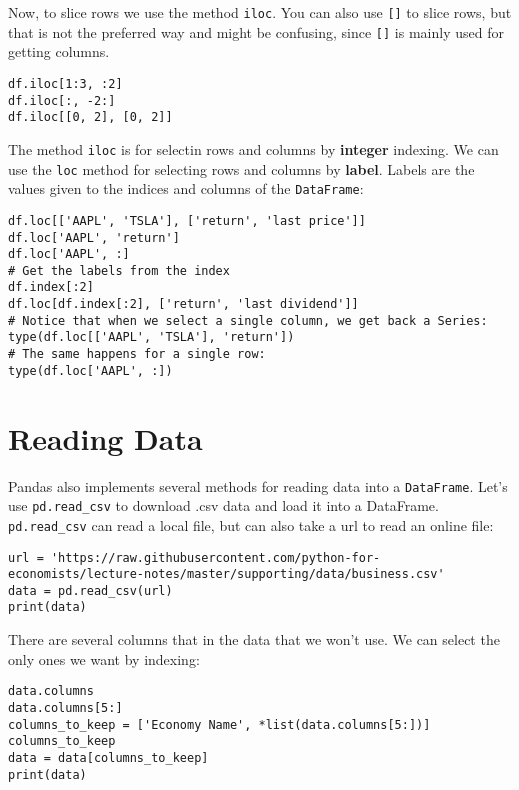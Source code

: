 \documentclass[12pt, a4paper]{article}
\begin{document}
Now, to slice rows we use the method \texttt{iloc}.
You can also use \texttt{[]} to slice rows, but that is not the preferred way and might be confusing, since \texttt{[]} is mainly used for getting columns.
\lstset{language=jupyter-python,label= ,caption= ,captionpos=b,numbers=none}
\begin{lstlisting}
df.iloc[1:3, :2]
df.iloc[:, -2:]
df.iloc[[0, 2], [0, 2]]
\end{lstlisting}
The method \texttt{iloc} is for selectin rows and columns by \textbf{\textbf{integer}} indexing.
We can use the \texttt{loc} method for selecting rows and columns by \textbf{\textbf{label}}.
Labels are the values given to the indices and columns of the \texttt{DataFrame}:
\lstset{language=jupyter-python,label= ,caption= ,captionpos=b,numbers=none}
\begin{lstlisting}
df.loc[['AAPL', 'TSLA'], ['return', 'last price']]
df.loc['AAPL', 'return']
df.loc['AAPL', :]
# Get the labels from the index
df.index[:2]
df.loc[df.index[:2], ['return', 'last dividend']]
# Notice that when we select a single column, we get back a Series:
type(df.loc[['AAPL', 'TSLA'], 'return'])
# The same happens for a single row:
type(df.loc['AAPL', :])
\end{lstlisting}
\section{Reading Data}
\label{sec:org9adbeb0}
Pandas also implements several methods for reading data into a \texttt{DataFrame}.
Let's use \texttt{pd.read\_csv} to download .csv data and load it into a DataFrame.
\texttt{pd.read\_csv} can read a local file, but can also take a url to read an online file:
\lstset{language=jupyter-python,label= ,caption= ,captionpos=b,numbers=none}
\begin{lstlisting}
url = 'https://raw.githubusercontent.com/python-for-economists/lecture-notes/master/supporting/data/business.csv'
data = pd.read_csv(url)
print(data)
\end{lstlisting}

There are several columns that in the data that we won't use.
We can select the only ones we want by indexing:
\lstset{language=jupyter-python,label= ,caption= ,captionpos=b,numbers=none}
\begin{lstlisting}
data.columns
data.columns[5:]
columns_to_keep = ['Economy Name', *list(data.columns[5:])]
columns_to_keep
data = data[columns_to_keep]
print(data)
\end{lstlisting}
\end{document}
